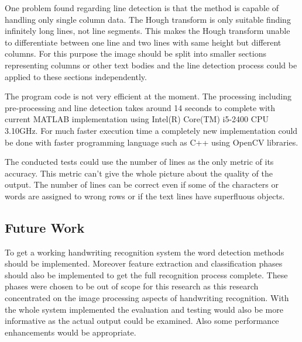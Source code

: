 \documentclass{article}
\begin{document}
      One problem found regarding line detection is that the method is capable of handling only single column data. The Hough transform is only suitable finding infinitely long lines, not line segments. This makes the Hough transform unable to differentiate between one line and two lines with same height but different columns. For this purpose the image should be split into smaller sections representing columns or other text bodies and the line detection process could be applied to these sections independently.

      The program code is not very efficient at the moment. The processing including pre-processing and line detection takes around 14 seconds to complete with current MATLAB implementation using Intel(R) Core(TM) i5-2400 CPU 3.10GHz. For much faster execution time a completely new implementation could be done with faster programming language such as C++ using OpenCV \cite{OpenCV} libraries.

      The conducted tests could use the number of lines as the only metric of its accuracy. This metric can't give the whole picture about the quality of the output. The number of lines can be correct even if some of the characters or words are assigned to wrong rows or if the text lines have superfluous objects.

    \subsection{Future Work}
      To get a working handwriting recognition system the word detection methods should be implemented. Moreover feature extraction and classification phases should also be implemented to get the full recognition process complete. These phases were chosen to be out of scope for this research as this research concentrated on the image processing aspects of handwriting recognition. With the whole system implemented the evaluation and testing would also be more informative as the actual output could be examined. Also some performance enhancements would be appropriate.

  \newpage
  
  
\end{document}
